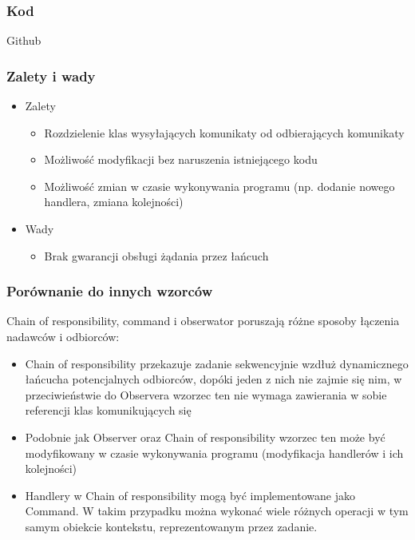 \documentclass[a4paper,15pt]{article}
\begin{document}
\subsubsection{Kod}
Github

\subsubsection{Zalety i wady}
\begin{itemize}
\item Zalety
\begin{itemize}
\item Rozdzielenie klas wysyłających komunikaty od odbierających komunikaty
\item Możliwość modyfikacji bez naruszenia istniejącego kodu
\item Możliwość zmian w czasie wykonywania programu (np. dodanie nowego handlera, zmiana kolejności)
\end{itemize}
\item Wady
\begin{itemize}
\item Brak gwarancji obsługi żądania przez łańcuch
\end{itemize}
\end{itemize}


\subsubsection{Porównanie do innych wzorców}

Chain of responsibility, command i obserwator poruszają różne sposoby łączenia nadawców i odbiorców: 

\begin{itemize}
\item Chain of responsibility przekazuje zadanie sekwencyjnie wzdłuż dynamicznego łańcucha potencjalnych odbiorców, dopóki jeden z nich
nie zajmie się nim, w przeciwieństwie do Observera wzorzec ten nie wymaga zawierania w sobie referencji klas komunikujących się
\item Podobnie jak Observer oraz Chain of responsibility wzorzec ten może być modyfikowany w czasie wykonywania programu (modyfikacja handlerów i ich kolejności) 
\end{itemize}

\begin{itemize}
\item Handlery w Chain of responsibility mogą być implementowane jako Command. W takim przypadku można wykonać wiele różnych operacji w tym samym obiekcie kontekstu, reprezentowanym przez zadanie.
\end{itemize}
\end{document}
